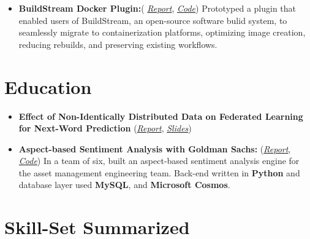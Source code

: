 \documentclass[a4paper]{deedy-resume} %
\begin{document}
\begin{itemize}
    \item \textbf{BuildStream Docker Plugin:}(
          \href{https://github.com/shashwatdalal/shashwatdalal.github.io/blob/master/files/placement_report.pdf}{\textit{Report}},
          \href{https://gitlab.com/BuildStream/bst-plugins-container}{\textit{Code}})
          \linebreak
          Prototyped a plugin that enabled users of BuildStream, an open-source software bulid system, to
          seamlessly migrate to containerization platforms, optimizing image creation, reducing rebuilds, and preserving existing workflows.
\end{itemize}
\section{Education}
\begin{itemize}
    \item \textbf{Effect of Non-Identically Distributed Data on Federated Learning for Next-Word Prediction}
          \linebreak
          (\href{https://shashwatdalal.github.io/files/fl_fyp.pdf}{\textit{Report}},
          \href{https://bit.ly/3bpAU8g}{\textit{Slides}})
    \item \textbf{Aspect-based Sentiment Analysis with Goldman Sachs:}
          (\href{https://rb.gy/8juk2v}{\textit{Report}},
          \href{https://dev.azure.com/vapesoc/362\%20Software\%20Engineering\%20Project/}{\textit{Code}})
          \linebreak
          In a team of six, built an aspect-based sentiment analysis engine for the asset management engineering team. Back-end written in \textbf{Python} and database layer used \textbf{MySQL}, and \textbf{Microsoft Cosmos}.

\end{itemize}
\section{Skill-Set Summarized}
\end{document}
